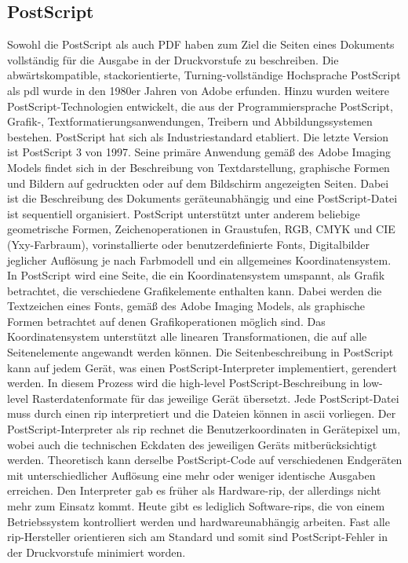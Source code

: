 \subsection{PostScript}
Sowohl die PostScript als auch PDF haben zum Ziel die Seiten eines Dokuments vollständig für die Ausgabe in der Druckvorstufe zu beschreiben. Die abwärtskompatible, stackorientierte, Turning-vollständige Hochsprache PostScript als \gls{pdl} wurde in den 1980er Jahren von Adobe erfunden. \cite{adobe-postscript, wiki-postscript} Hinzu wurden weitere PostScript-Technologien entwickelt, die aus der Programmiersprache PostScript, Grafik-, Textformatierungsanwendungen, Treibern und Abbildungssystemen bestehen. PostScript hat sich als Industriestandard etabliert. Die letzte Version ist PostScript 3 von 1997. Seine primäre Anwendung gemäß des Adobe Imaging Models findet sich in der Beschreibung von Textdarstellung, graphische Formen und Bildern auf gedruckten oder auf dem Bildschirm angezeigten Seiten. Dabei ist die Beschreibung des Dokuments geräteunabhängig und eine PostScript-Datei ist sequentiell organisiert. PostScript unterstützt unter anderem beliebige geometrische Formen, Zeichenoperationen in Graustufen, RGB, CMYK und CIE (Yxy-Farbraum),  vorinstallierte oder benutzerdefinierte Fonts, Digitalbilder jeglicher Auflösung je nach Farbmodell und ein allgemeines Koordinatensystem. \\
In PostScript wird eine Seite, die ein Koordinatensystem umspannt, als Grafik betrachtet, die verschiedene Grafikelemente enthalten kann. Dabei werden die Textzeichen eines Fonts, gemäß des Adobe Imaging Models, als graphische Formen betrachtet auf denen Grafikoperationen möglich sind. Das Koordinatensystem unterstützt alle linearen Transformationen, die auf alle Seitenelemente angewandt werden können. Die Seitenbeschreibung in PostScript kann auf jedem Gerät, was einen PostScript-Interpreter implementiert, gerendert werden. In diesem Prozess wird die high-level PostScript-Beschreibung in low-level Rasterdatenformate für das jeweilige Gerät übersetzt.  \cite{adobe-postscript} Jede PostScript-Datei muss durch einen \gls{rip} interpretiert und die Dateien können in \gls{ascii} vorliegen. \cite{adobe-postscript} Der PostScript-Interpreter als \gls{rip} rechnet die Benutzerkoordinaten in Gerätepixel um, wobei auch die technischen Eckdaten des jeweiligen Geräts mitberücksichtigt werden. Theoretisch kann derselbe PostScript-Code auf verschiedenen Endgeräten mit unterschiedlicher Auflösung eine mehr oder weniger identische Ausgaben erreichen. Den Interpreter gab es früher als Hardware-\gls{rip}, der allerdings nicht mehr zum Einsatz kommt. Heute gibt es lediglich Software-\gls{rip}s, die von einem Betriebssystem kontrolliert werden und hardwareunabhängig arbeiten. Fast alle \gls{rip}-Hersteller orientieren sich am Standard und somit sind PostScript-Fehler in der Druckvorstufe minimiert worden. \cite{schneeberger}


